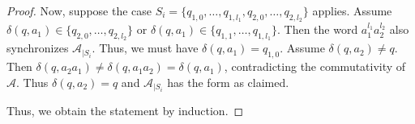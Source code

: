 \begin{proof}
Now, suppose the case $S_i = \{ q_{1, 0}, \ldots, q_{1, l_1}, q_{2, 0}, \ldots, q_{2, l_2}\}$
applies. Assume $\delta(q, a_1) \in \{q_{2,0},\ldots, q_{2,l_2}\}$
or $\delta(q, a_1) \in \{q_{1,1},\ldots,q_{1,l_1}\}$.
Then the word $a_1^{l_1} a_2^{l_2}$ also synchronizes $\mathcal A_{|S_i}$.
Thus, we must have $\delta(q, a_1) = q_{1,0}$.
Assume $\delta(q, a_2) \ne q$.
Then $\delta(q, a_2 a_1) \ne \delta(q, a_1a_2) = \delta(q, a_1)$,
contradicting the commutativity of~$\mathcal A$. Thus $\delta(q, a_2) = q$
and $\mathcal A_{|S_i}$ has the form as claimed.

Thus, we obtain the statement by induction.
\end{proof}